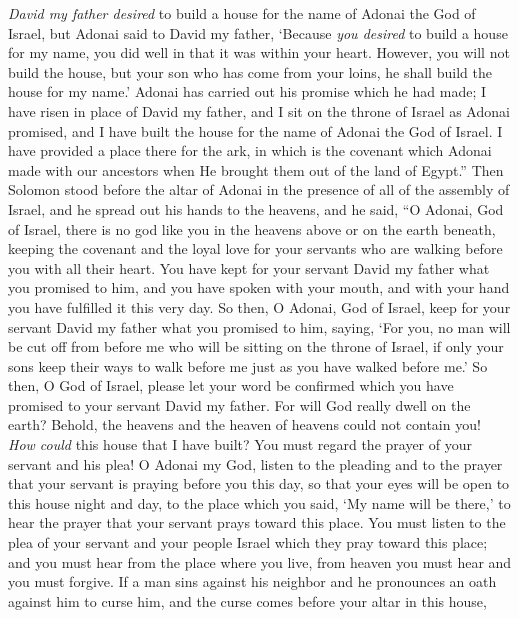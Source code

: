 \begin{biblechapter}
\verse \textit{David my father desired} to build a house for the name of Adonai the God of Israel,
\verse but Adonai said to David my father, ‘Because \textit{you desired} to build a house for my name, you did well in that it was within your heart.
\verse However, you will not build the house, but your son who has come from your loins, he shall build the house for my name.’
\verse Adonai has carried out his promise which he had made; I have risen in place of David my father, and I sit on the throne of Israel as Adonai promised, and I have built the house for the name of Adonai the God of Israel.
\verse I have provided a place there for the ark, in which is the covenant which Adonai made with our ancestors when He brought them out of the land of Egypt.”
 Then Solomon stood before the altar of Adonai in the presence of all of the assembly of Israel, and he spread out his hands to the heavens,
\verse and he said, “O Adonai, God of Israel, there is no god like you in the heavens above or on the earth beneath, keeping the covenant and the loyal love for your servants who are walking before you with all their heart.
\verse You have kept for your servant David my father what you promised to him, and you have spoken with your mouth, and with your hand you have fulfilled it this very day.
\verse So then, O Adonai, God of Israel, keep for your servant David my father what you promised to him, saying, ‘For you, no man will be cut off from before me who will be sitting on the throne of Israel, if only your sons keep their ways to walk before me just as you have walked before me.’
\verse So then, O God of Israel, please let your word be confirmed which you have promised to your servant David my father.
\verse For will God really dwell on the earth? Behold, the heavens and the heaven of heavens could not contain you! \textit{How could} this house that I have built?
\verse You must regard the prayer of your servant and his plea! O Adonai my God, listen to the pleading and to the prayer that your servant is praying before you this day,
\verse so that your eyes will be open to this house night and day, to the place which you said, ‘My name will be there,’ to hear the prayer that your servant prays toward this place.
\verse You must listen to the plea of your servant and your people Israel which they pray toward this place; and you must hear from the place where you live, from heaven you must hear and you must forgive.
\verse If a man sins against his neighbor and he pronounces an oath against him to curse him, and the curse comes before your altar in this house,

\end{biblechapter}
